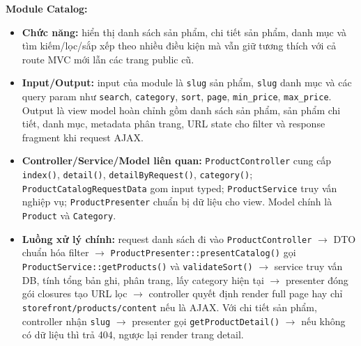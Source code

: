 \documentclass[a4paper]{article}
\begin{document}
\textbf{Module Catalog:}
\begin{itemize}
    \item \textbf{Chức năng:} hiển thị danh sách sản phẩm, chi tiết sản phẩm, danh mục và tìm kiếm/lọc/sắp xếp theo nhiều điều kiện mà vẫn giữ tương thích với cả route MVC mới lẫn các trang public cũ.
    \item \textbf{Input/Output:} input của module là \texttt{slug} sản phẩm, \texttt{slug} danh mục và các query param như \texttt{search}, \texttt{category}, \texttt{sort}, \texttt{page}, \texttt{min\_price}, \texttt{max\_price}. Output là view model hoàn chỉnh gồm danh sách sản phẩm, sản phẩm chi tiết, danh mục, metadata phân trang, URL state cho filter và response fragment khi request AJAX.
    \item \textbf{Controller/Service/Model liên quan:} \texttt{ProductController} cung cấp \texttt{index()}, \texttt{detail()}, \texttt{detailByRequest()}, \texttt{category()}; \texttt{ProductCatalogRequestData} gom input typed; \texttt{ProductService} truy vấn nghiệp vụ; \texttt{ProductPresenter} chuẩn bị dữ liệu cho view. Model chính là \texttt{Product} và \texttt{Category}.
    \item \textbf{Luồng xử lý chính:} request danh sách đi vào \texttt{ProductController} $\to$ DTO chuẩn hóa filter $\to$ \texttt{ProductPresenter::presentCatalog()} gọi \texttt{ProductService::getProducts()} và \texttt{validateSort()} $\to$ service truy vấn DB, tính tổng bản ghi, phân trang, lấy category hiện tại $\to$ presenter đóng gói closures tạo URL lọc $\to$ controller quyết định render full page hay chỉ \texttt{storefront/products/content} nếu là AJAX. Với chi tiết sản phẩm, controller nhận \texttt{slug} $\to$ presenter gọi \texttt{getProductDetail()} $\to$ nếu không có dữ liệu thì trả 404, ngược lại render trang detail.
\end{itemize}
\end{document}

